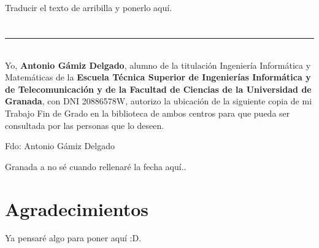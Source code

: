 \\

\vspace{0.7cm}
\\

Traducir el texto de arribilla y ponerlo aquí.


\chapter*{}
\thispagestyle{empty}

\noindent\rule[-1ex]{\textwidth}{2pt}\\[4.5ex]

Yo, \textbf{Antonio Gámiz Delgado}, alumno de la titulación Ingeniería Informática y Matemáticas de la \textbf{Escuela Técnica Superior
de Ingenierías Informática y de Telecomunicación y de la Facultad de Ciencias de la Universidad de Granada}, con DNI 20886578W, autorizo la
ubicación de la siguiente copia de mi Trabajo Fin de Grado en la biblioteca de ambos centros para que pueda ser consultada por las personas que lo deseen.

\vspace{6cm}

\noindent Fdo: Antonio Gámiz Delgado

\vspace{2cm}

\begin{flushright}
Granada a no sé cuando rellenaré la fecha aquí..
\end{flushright}


\chapter*{Agradecimientos}
\thispagestyle{empty}
\vspace{1cm}

Ya pensaré algo para poner aquí :D.
